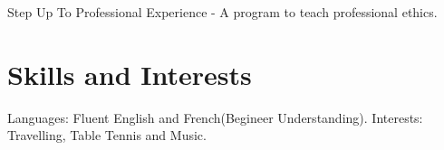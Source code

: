 \documentclass{Mihir_Kavatkar-Resume}
\begin{document}
		\vspace*{-0.5em}
		\workitemsAdditional
		{Step Up To Professional Experience - A program to teach professional ethics.}
		
	\section{Skills and Interests}
		\workitems
		{Languages: Fluent English and French(Begineer Understanding).}
		{Interests: Travelling, Table Tennis and Music.}	
		
		
		
		
\end{document}
